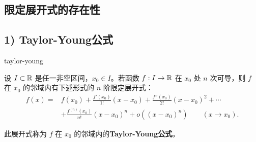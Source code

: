 \subsection{限定展开式的存在性}
	\label{sec:8-2-5}

\subsection*{1) Taylor-Young公式}

\begin{mythm}{}{taylor-young}

设 $I\subset\mathbb{R}$ 是任一非空区间，$x_0\in I$。若函数 $f:I\to\mathbb{R}$ 在 $x_0$ 处 $n$ 次可导，则 $f$ 在 $x_0$ 的邻域内有下述形式的 $n$ 阶限定展开式：
\[\begin{aligned}
f(x)={}&f(x_0)+\frac{f'(x_0)}{1!}(x-x_0)+\frac{f''(x_0)}{2!}(x-x_0)^2+\cdots\\
&+\frac{f^{(n)}(x_0)}{n!}(x-x_0)^n+o((x-x_0)^n)\qquad(x\to x_0).
\end{aligned}\]

\end{mythm}

此展开式称为 $f$ 在 $x_0$ 的邻域内的\textbf{Taylor-Young公式}。


